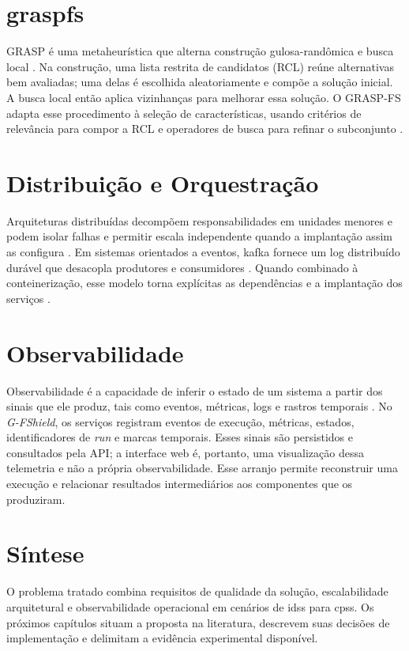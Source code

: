 \section{\ac{graspfs}}

GRASP é uma metaheurística que alterna construção gulosa-randômica e busca local \cite{ResendeRibeiro2010}. Na construção, uma lista restrita de candidatos (RCL) reúne alternativas bem avaliadas; uma delas é escolhida aleatoriamente e compõe a solução inicial. A busca local então aplica vizinhanças para melhorar essa solução. O GRASP-FS adapta esse procedimento à seleção de características, usando critérios de relevância para compor a RCL e operadores de busca para refinar o subconjunto \cite{quincozes2020grasp,quincozes2021performance,quincozes2022extended}.

\section{Distribuição e Orquestração}

Arquiteturas distribuídas decompõem responsabilidades em unidades menores e podem isolar falhas e permitir escala independente quando a implantação assim as configura \cite{Tanenbaum2007Distributed,Newman2021}. Em sistemas orientados a eventos, \ac{kafka} fornece um log distribuído durável que desacopla produtores e consumidores \cite{Kreps2011}. Quando combinado à conteinerização, esse modelo torna explícitas as dependências e a implantação dos serviços \cite{Anderson2015Docker}.

\section{Observabilidade}

Observabilidade é a capacidade de inferir o estado de um sistema a partir dos sinais que ele produz, tais como eventos, métricas, logs e rastros temporais \cite{beyer2016site,usman2022observabilitysurvey}. No \textit{G-FShield}, os serviços registram eventos de execução, métricas, estados, identificadores de \textit{run} e marcas temporais. Esses sinais são persistidos e consultados pela API; a interface web é, portanto, uma visualização dessa telemetria e não a própria observabilidade. Esse arranjo permite reconstruir uma execução e relacionar resultados intermediários aos componentes que os produziram.

\section{Síntese}

O problema tratado combina requisitos de qualidade da solução, escalabilidade arquitetural e observabilidade operacional em cenários de \acp{ids} para \acp{cps}. Os próximos capítulos situam a proposta na literatura, descrevem suas decisões de implementação e delimitam a evidência experimental disponível.
